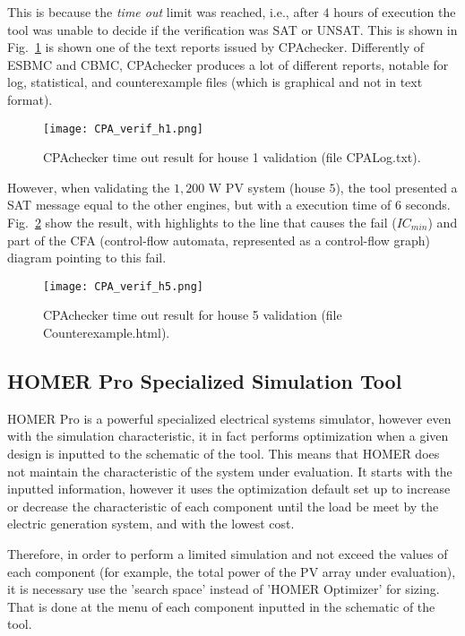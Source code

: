 This is because the \textit{time out} limit was reached, i.e., after $4$ hours of execution the tool was unable to decide if the verification was SAT or UNSAT. This is shown in Fig.~\ref{fig:cpavalidh1} is shown one of the text reports issued by CPAchecker. Differently of ESBMC and CBMC, CPAchecker produces a lot of different reports, notable for log, statistical, and counterexample files (which is graphical and not in text format).

\begin{figure}[h]
\texttt{[image: CPA\_verif\_h1.png]}
\centering
\caption{CPAchecker time out result for house 1 validation (file CPALog.txt).}
\label{fig:cpavalidh1}
\end{figure}

However, when validating the $1,200$ W PV system (house $5$), the tool presented a SAT message equal to the other engines, but with a execution time of $6$ seconds. Fig.~\ref{fig:cpavalidh5} show the result, with highlights to the line that causes the fail ($IC_{min}$) and part of the CFA (control-flow automata, represented as a control-flow graph) diagram pointing to this fail.

\begin{figure}[h]
\texttt{[image: CPA\_verif\_h5.png]}
\centering
\caption{CPAchecker time out result for house 5 validation (file Counterexample.html).}
\label{fig:cpavalidh5}
\end{figure}


\subsection{HOMER Pro Specialized Simulation Tool}
\label{sec:homerenviron}

HOMER Pro is a powerful specialized electrical systems simulator, however even with the simulation characteristic, it in fact performs optimization when a given design is inputted to the schematic of the tool. This means that HOMER does not maintain the characteristic of the system under evaluation. It starts with the inputted information, however it uses the optimization default set up to increase or decrease the characteristic of each component until the load be meet by the electric generation system, and with the lowest cost. 

Therefore, in order to perform a limited simulation and not exceed the values of each component (for example, the total power of the PV array under evaluation), it is necessary use the 'search space' instead of 'HOMER Optimizer' for sizing. That is done at the menu of each component inputted in the schematic of the tool. 

